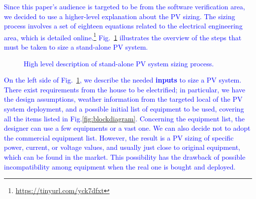 \documentclass[runningheads]{llncs}
\begin{document}
\textcolor{blue}{Since this paper's audience is targeted to be from the software verification area, we decided to use a higher-level explanation about the PV sizing. The sizing process involves a set of eighteen equations related to the electrical engineering area, which is detailed online.\footnote{\url{https://tinyurl.com/yck7dfxt}} Fig.~\ref{fig:flow} illustrates the overview of the steps that must be taken to size a stand-alone PV system.}
%
\begin{figure}[h]
\centering
\caption{\textcolor{blue}{High level description of stand-alone PV system sizing process.}}
\label{fig:flow} 
\end{figure}

\textcolor{blue}{On the left side of Fig.~\ref{fig:flow}, we describe the needed \textbf{inputs} to size a PV system. There exist requirements from the house to be electrified; in particular, we have the design assumptions, weather information from the targeted local of the PV system deployment, and a possible initial list of equipment to be used, covering all the items listed in Fig.\ref{fig:blockdiagram}. Concerning the equipment list, the designer can use a few equipments or a vast one. We can also decide not to adopt the commercial equipment list. However, the result is a PV sizing of specific power, current, or voltage values, and usually just close to original equipment, which can be found in the market. This possibility has the drawback of possible incompatibility among equipment when the real one is bought and deployed.}
\end{document}
